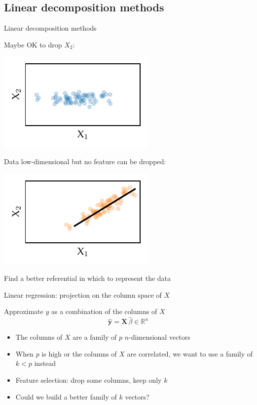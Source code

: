 \documentclass[presentation,mathserif,table]{beamer}
\newcommand{\X}{{\mathbold X}}
\newcommand{\y}{{\mathbold y}}
\newcommand{\R}{\mathbb{R}}
\begin{document}
\subsection{Linear decomposition methods}
\label{sec:orge814a78}
\begin{frame}[label={sec:org0ecd45b}]{Linear decomposition methods}
\begin{block}{Maybe OK to drop \(X_2\):}
\vspace{-10pt}
\begin{center}
\includegraphics[height=.3\textheight]{figures/generated/pca/cloud_aligned.pdf}
\end{center}
\vspace{-20pt}
\end{block}
\begin{block}{Data low-dimensional but no feature can be dropped:}
\begin{center}
\includegraphics[height=.3\textheight]{figures/generated/pca/cloud_not_aligned.pdf}
\end{center}

Find a better referential in which to represent the data
\end{block}
\end{frame}
\begin{frame}[label={sec:org5b1acf9}]{Linear regression: projection on the column space of \(X\)}
\begin{block}{Approximate \(y\) as a combination of the columns of \(X\)}
\begin{equation}
\hat{\y} = \X \, \hat{\beta} \in \R^n
\end{equation}
\begin{itemize}
\item The columns of \(X\) are a family of \(p\) \(n\)-dimensional vectors
\item When \(p\) is high or the columns of \(X\) are correlated, we want to use a family of \(k < p\) instead
\item Feature selection: drop some columns, keep only \(k\)
\item Could we build a better family of \(k\) vectors?
\end{itemize}
\end{block}
\end{frame}
\end{document}
